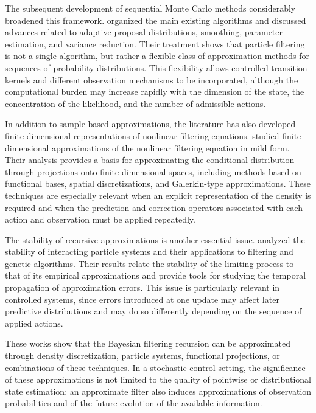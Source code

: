 \documentclass[10pt,twocolumn]{article}
\theoremstyle{remark}
\begin{document}
The subsequent development of sequential Monte Carlo methods considerably broadened this framework. \citet{CappeGodsillMoulines2007SequentialMonteCarlo} organized the main existing algorithms and discussed advances related to adaptive proposal distributions, smoothing, parameter estimation, and variance reduction. Their treatment shows that particle filtering is not a single algorithm, but rather a flexible class of approximation methods for sequences of probability distributions. This flexibility allows controlled transition kernels and different observation mechanisms to be incorporated, although the computational burden may increase rapidly with the dimension of the state, the concentration of the likelihood, and the number of admissible actions.

In addition to sample-based approximations, the literature has also developed finite-dimensional representations of nonlinear filtering equations. \citet{GermaniPiccioni1987FiniteDimensionalFiltering} studied finite-dimensional approximations of the nonlinear filtering equation in mild form. Their analysis provides a basis for approximating the conditional distribution through projections onto finite-dimensional spaces, including methods based on functional bases, spatial discretizations, and Galerkin-type approximations. These techniques are especially relevant when an explicit representation of the density is required and when the prediction and correction operators associated with each action and observation must be applied repeatedly.

The stability of recursive approximations is another essential issue. \citet{DelMoralGuionnet2001InteractingProcesses} analyzed the stability of interacting particle systems and their applications to filtering and genetic algorithms. Their results relate the stability of the limiting process to that of its empirical approximations and provide tools for studying the temporal propagation of approximation errors. This issue is particularly relevant in controlled systems, since errors introduced at one update may affect later predictive distributions and may do so differently depending on the sequence of applied actions.

These works show that the Bayesian filtering recursion can be approximated through density discretization, particle systems, functional projections, or combinations of these techniques. In a stochastic control setting, the significance of these approximations is not limited to the quality of pointwise or distributional state estimation: an approximate filter also induces approximations of observation probabilities and of the future evolution of the available information. 
\end{document}
